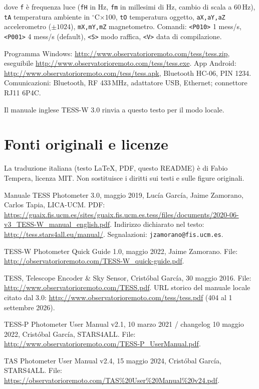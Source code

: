 \documentclass[11pt,a4paper]{report}
\begin{document}
dove \texttt{f} è frequenza luce (\texttt{fH} in Hz, \texttt{fm} in millesimi di Hz, cambio di scala a 60\,Hz), \texttt{tA} temperatura ambiente in $^\circ$C$\times 100$, \texttt{tO} temperatura oggetto, \texttt{aX,aY,aZ} accelerometro ($\pm 1024$), \texttt{mX,mY,mZ} magnetometro. Comandi: \texttt{<P010>} 1 mess/s, \texttt{<P001>} 4 mess/s (default), \texttt{<S>} modo raffica, \texttt{<V>} data di compilazione.

Programma Windows: \url{http://www.observatorioremoto.com/tess/tess.zip}, eseguibile \url{http://www.observatorioremoto.com/tess/tess.exe}. App Android: \url{http://www.observatorioremoto.com/tess/tess.apk}, Bluetooth HC-06, PIN 1234. Comunicazioni: Bluetooth, RF 433\,MHz, adattatore USB, Ethernet; connettore RJ11 6P4C.

Il manuale inglese TESS-W 3.0 rinvia a questo testo per il modo locale.

\chapter{Fonti originali e licenze}
\label{cap:fonti}

La traduzione italiana (testo LaTeX, PDF, questo README) è di Fabio Tempera, licenza MIT. Non sostituisce i diritti sui testi e sulle figure originali.

Manuale TESS Photometer 3.0, maggio 2019, Lucía García, Jaime Zamorano, Carlos Tapia, LICA-UCM. PDF: \url{https://guaix.fis.ucm.es/sites/guaix.fis.ucm.es.tess/files/documents/2020-06-v3_TESS-W_manual_english.pdf}. Indirizzo dichiarato nel testo: \url{http://tess.stars4all.eu/manual/}. Segnalazioni: \texttt{jzamorano@fis.ucm.es}.

TESS-W Photometer Quick Guide 1.0, maggio 2022, Jaime Zamorano. File: \url{http://observatorioremoto.com/TESS-W_quick-guide.pdf}.

TESS, Telescope Encoder \& Sky Sensor, Cristóbal García, 30 maggio 2016. File: \url{http://www.observatorioremoto.com/TESS.pdf}. URL storico del manuale locale citato dal 3.0: \url{http://www.observatorioremoto.com/tess/tess.pdf} (404 al 1 settembre 2026).

TESS-P Photometer User Manual v2.1, 10 marzo 2021 / changelog 10 maggio 2022, Cristóbal García, STARS4ALL. File: \url{http://www.observatorioremoto.com/TESS-P_UserManual.pdf}.

TAS Photometer User Manual v2.4, 15 maggio 2024, Cristóbal García, STARS4ALL. File: \url{https://observatorioremoto.com/TAS\%20User\%20Manual\%20v24.pdf}.
\end{document}

